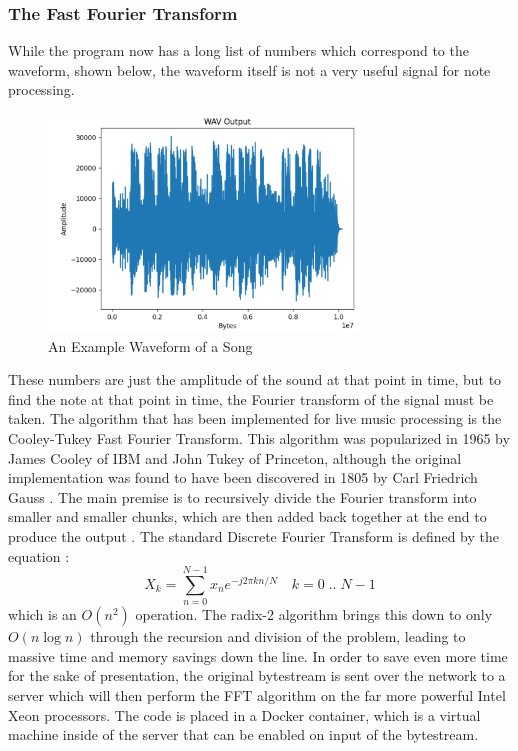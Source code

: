 \documentclass[UTF8, 12pt]{article}
\begin{document}
\subsubsection{The Fast Fourier Transform}
    While the program now has a long list of numbers which correspond to the waveform, shown below, the waveform itself is not a very useful signal for note processing.
    \begin{figure}[h]
        \centering
        \includegraphics[width=0.75\textwidth]{waveform.png}
        \caption{An Example Waveform of a Song}
    \end{figure}
    These numbers are just the amplitude of the sound at that point in time, but to find the note at that point in time, the Fourier transform of the signal must be taken. The algorithm that has been implemented for live music processing is the Cooley-Tukey Fast Fourier Transform. This algorithm was popularized in 1965 by James Cooley of IBM and John Tukey of Princeton, although the original implementation was found to have been discovered in 1805 by Carl Friedrich Gauss \cite{fft_wiki}. The main premise is to recursively divide the Fourier transform into smaller and smaller chunks, which are then added back together at the end to produce the output \cite{fft_paper}. The standard Discrete Fourier Transform is defined by the equation \cite{fft_wiki}:
    \begin{equation}
        X_k = \sum_{n=0}^{N-1}x_ne^{-j2{\pi}kn/N} \quad k = 0 \; .. \; N - 1
    \end{equation}
    which is an $O(n^2)$ operation. The radix-2 algorithm brings this down to only $O(n\log{}n)$ through the recursion and division of the problem, leading to massive time and memory savings down the line. In order to save even more time for the sake of presentation, the original bytestream is sent over the network to a server which will then perform the FFT algorithm on the far more powerful Intel Xeon processors. The code is placed in a Docker container, which is a virtual machine inside of the server that can be enabled on input of the bytestream. 
\end{document}
